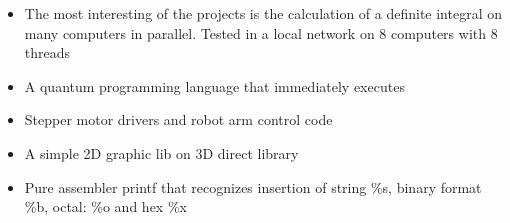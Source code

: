 \documentclass[10pt,a4paper]{altacv}
\begin{document}
\begin{itemize}
  \item \small{The most interesting of the projects is the calculation of a definite integral on many computers in parallel. Tested in a local network on 8 computers with 8 threads}
\end{itemize}
\divider

\begin{itemize}
  \item \small{A quantum programming language that immediately executes}
\end{itemize}
\divider

\begin{itemize}
  \item \small{Stepper motor drivers and robot arm control code}
\end{itemize}
\divider

\begin{itemize}
  \item \small{A simple 2D graphic lib on 3D direct library}
\end{itemize}
\divider

\begin{itemize}
  \item \small{Pure assembler printf that recognizes insertion of string \%s, binary format \%b, octal: \%o and hex \%x}
\end{itemize}












\end{document}

